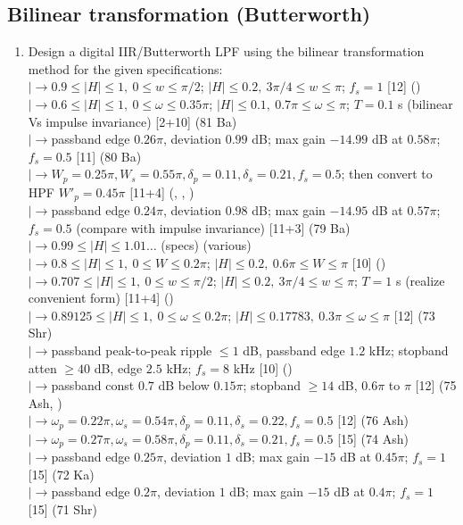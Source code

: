 \documentclass[12pt]{article}
\newcommand{\lb}{\\$\left|\rightarrow\right.$}
\begin{document}
  \subsection{Bilinear transformation (Butterworth)}
    \begin{enumerate}[topsep=0pt, noitemsep]
      \item Design a digital IIR/Butterworth LPF using the bilinear transformation method for the given specifications:
        \lb $0.9\le|H|\le1,\ 0\le w\le\pi/2$; $|H|\le0.2,\ 3\pi/4\le w\le\pi$; $f_s=1$ \hfill [12] ()
        \lb $0.6\le|H|\le1,\ 0\le\omega\le0.35\pi$; $|H|\le0.1,\ 0.7\pi\le\omega\le\pi$; $T=0.1$ s (bilinear Vs impulse invariance) \hfill [2+10] (81 Ba)
        \lb passband edge $0.26\pi$, deviation $0.99$ dB; max gain $-14.99$ dB at $0.58\pi$; $f_s=0.5$ \hfill [11] (80 Ba)
        \lb $W_p=0.25\pi,W_s=0.55\pi,\delta_p=0.11,\delta_s=0.21,f_s=0.5$; then convert to HPF $W'_p=0.45\pi$ \hfill [11+4] (, , )
        \lb passband edge $0.24\pi$, deviation $0.98$ dB; max gain $-14.95$ dB at $0.57\pi$; $f_s=0.5$ (compare with impulse invariance) \hfill [11+3] (79 Ba)
        \lb $0.99\le|H|\le1.01\dots$ (specs) \hfill (various)
        \lb $0.8\le|H|\le1,\ 0\le W\le0.2\pi$; $|H|\le0.2,\ 0.6\pi\le W\le\pi$ \hfill [10] ()
        \lb $0.707\le|H|\le1,\ 0\le w\le\pi/2$; $|H|\le0.2,\ 3\pi/4\le w\le\pi$; $T=1$ s (realize convenient form) \hfill [11+4] ()
        \lb $0.89125\le|H|\le1,\ 0\le\omega\le0.2\pi$; $|H|\le0.17783,\ 0.3\pi\le\omega\le\pi$ \hfill [12] (73 Shr)
        \lb passband peak-to-peak ripple $\le1$ dB, passband edge $1.2$ kHz; stopband atten $\ge40$ dB, edge $2.5$ kHz; $f_s=8$ kHz \hfill [10] ()
        \lb passband const $0.7$ dB below $0.15\pi$; stopband $\ge14$ dB, $0.6\pi$ to $\pi$ \hfill [12] (75 Ash, )
        \lb $\omega_p=0.22\pi,\omega_s=0.54\pi,\delta_p=0.11,\delta_s=0.22,f_s=0.5$ \hfill [12] (76 Ash)
        \lb $\omega_p=0.27\pi,\omega_s=0.58\pi,\delta_p=0.11,\delta_s=0.21,f_s=0.5$ \hfill [15] (74 Ash)
        \lb passband edge $0.25\pi$, deviation $1$ dB; max gain $-15$ dB at $0.45\pi$; $f_s=1$ \hfill [15] (72 Ka)
        \lb passband edge $0.2\pi$, deviation $1$ dB; max gain $-15$ dB at $0.4\pi$; $f_s=1$ \hfill [15] (71 Shr)
    \end{enumerate}
\end{document}
